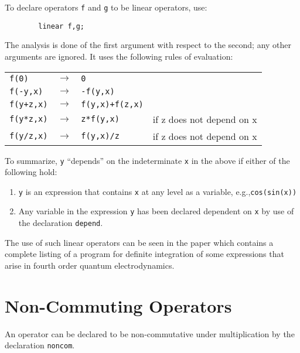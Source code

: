 To declare operators \texttt{f} and \texttt{g} to be linear operators,
use:
\begin{verbatim}
        linear f,g;
\end{verbatim}
The analysis is done of the first argument with respect to the second; any
other arguments are ignored. It uses the following rules of evaluation:
\begin{flushleft}
  \hspace{0.5in}%
  \begin{tabular}{llll}
    \texttt{f(0)}     & $\longrightarrow$ & \texttt{0} \\
    \texttt{f(-y,x)}  & $\longrightarrow$ & \texttt{-f(y,x)} \\
    \texttt{f(y+z,x)} & $\longrightarrow$ & \texttt{f(y,x)+f(z,x)} & \\
    \texttt{f(y*z,x)} & $\longrightarrow$ & \texttt{z*f(y,x)}      &
    if z does not depend on x \\
    \texttt{f(y/z,x)} & $\longrightarrow$ & \texttt{f(y,x)/z}      &
    if z does not depend on x
  \end{tabular}
\end{flushleft}
To summarize, \texttt{y} ``depends'' on the indeterminate \texttt{x} in the above
if either of the following hold:
\begin{enumerate}
\item \texttt{y} is an expression that contains \texttt{x} at any level as a
      variable, e.g.,\linebreak \texttt{cos(sin(x))}

\item Any variable in the expression \texttt{y} has been declared dependent on
      \texttt{x} by use of the declaration \texttt{depend}.
\end{enumerate}
The use of such linear operators can be seen in the
paper \cite{Fox:74} which contains a complete listing of a program for definite
integration of some expressions that arise in fourth
order quantum electrodynamics.

\section{Non-Commuting Operators}
\hypertarget{command:NONCOM}{}
An operator can be declared to be non-commutative under multiplication by
the declaration \texttt{noncom}.


